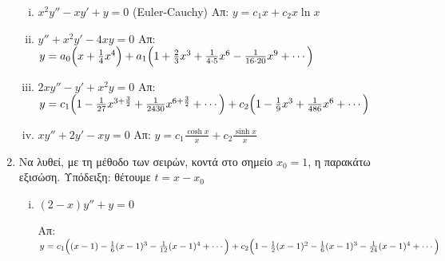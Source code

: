 \begin{enumerate}
\begin{enumerate}[i)]
      \item $ x^{2}y''-xy'+y=0 $ \quad (Euler-Cauchy)
        \hfill Απ: $ y= c_{1}x + c_{2}x \ln{x} $ 

      \item $y''+x^2y'-4xy=0$
        \hfill Απ:
        $y= a_{0}\Bigl(x+\frac{1}{4}x^4\Bigr) + a_{1}\Bigl(1+\frac{2}{3}x^3+\frac{1}
        {4\cdot 5}x^6- \frac{1}{16\cdot 20}x^9+\cdots\Bigr) $

      \item $2xy''-y'+x^{2}y=0 $
        \hfill Απ:  $ y= c_{1}\Bigl(1- \frac{1}{27} x^{3+ \frac{3}{2}} + 
        \frac{1}{2430} x^{6+ \frac{3}{2} } + \cdots\Bigr) + 
        c_{2}\Bigl(1 - \frac{1}{9} x^{3} + \frac{1}{486} x^{6} + \cdots \Bigr) $

      \item $xy''+2y'-xy=0$
        \hfill Απ: 
        $y= c_{1}\frac{\cosh x}{x} + c_{2}\frac{\sinh x}{x}$
    \end{enumerate}

  \item Να λυθεί, με τη μέθοδο των σειρών, κοντά στο σημείο $ x_{0}=1 $, η παρακάτω
    εξισώση. \textcolor{Col1}{Υπόδειξη}: θέτουμε $ t=x- x_{0} $
    \begin{enumerate}[i)]
      \item $ (2-x)y'' + y=0 $

        \hfill Απ: $ y= c_{1}\Bigl((x-1)- \frac{1}{6} (x-1)^{3}- \frac{1}{12} (x-1)^{4} 
          + \cdots\Bigr) + c_{2}\Bigl(1- \frac{1}{2} (x-1)^{2} - \frac{1}{6} (x-1)^{3} 
          - \frac{1}{24} (x-1)^{4} + \cdots \Bigr) $  
    \end{enumerate}
    
\end{enumerate}


